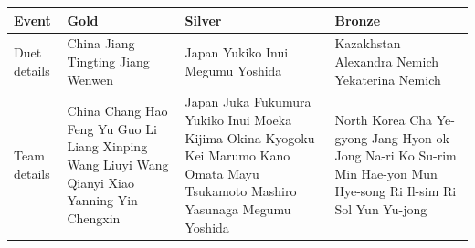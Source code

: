\documentclass{article}
\begin{document}
\begin{tabular}{llll}
\toprule
Event & Gold & Silver & Bronze \\
\midrule
Duet details & China Jiang Tingting Jiang Wenwen & Japan Yukiko Inui Megumu Yoshida & Kazakhstan Alexandra Nemich Yekaterina Nemich \\
Team details & China Chang Hao Feng Yu Guo Li Liang Xinping Wang Liuyi Wang Qianyi Xiao Yanning Yin Chengxin & Japan Juka Fukumura Yukiko Inui Moeka Kijima Okina Kyogoku Kei Marumo Kano Omata Mayu Tsukamoto Mashiro Yasunaga Megumu Yoshida & North Korea Cha Ye-gyong Jang Hyon-ok Jong Na-ri Ko Su-rim Min Hae-yon Mun Hye-song Ri Il-sim Ri Sol Yun Yu-jong \\
\bottomrule
\end{tabular}
\end{document}
